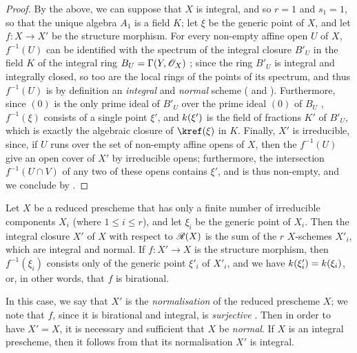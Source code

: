 \begin{proof}
By the above, we can suppose that $X$ is integral, and so $r=1$ and $s_1=1$, so that the unique algebra $A_1$ is a field $K$;
let $\xi$ be the generic point of $X$, and let $f:X\to X'$ be the structure morphism.
For every non-empty affine open $U$ of $X$, $f^{-1}(U)$ can be identified with the spectrum of the integral closure $B'_U$ in the field $K$ of the integral ring $B_U=\Gamma(Y,\mathscr{O}_X)$ ;
since the ring $B'_U$ is integral and integrally closed, so too are the local rings of the points of its spectrum, and thus $f^{-1}(U)$ is by definition an \emph{integral} and \emph{normal} scheme ( and ).
Furthermore, since $(0)$ is the only prime ideal of $B'_U$ over the prime ideal $(0)$ of $B_U$ \cite[t.~1, p.~259]{I-13}, $f^{-1}(\xi)$ consists of a single point $\xi'$, and $k(\xi')$ is the field of fractions $K'$ of $B'_U$, which is exactly the algebraic closure of $\kref(\xi)$ in $K$.
Finally, $X'$ is irreducible, since, if $U$ runs over the set of non-empty affine opens of $X$, then the $f^{-1}(U)$ give an open cover of $X'$ by irreducible opens;
furthermore, the intersection $f^{-1}(U\cap V)$ of any two of these opens contains $\xi'$, and is thus non-empty, and we conclude by .
\end{proof}

\begin{corollary}
Let $X$ be a reduced prescheme that has only a finite number of irreducible components $X_i$ (where $1\leq i\leq r$), and let $\xi_i$ be the generic point of $X_i$.
Then the integral closure $X'$ of $X$ with respect to $\mathscr{R}(X)$ is the sum of the $r$ $X$-schemes $X'_i$, which are integral and normal.
If $f:X'\to X$ is the structure morphism, then $f^{-1}(\xi_i)$ consists only of the generic point $\xi'_i$ of $X'_i$, and we have $k(\xi'_i)=k(\xi_i)$, or, in other words, that $f$ is birational.
\end{corollary}

In this case, we say that $X'$ is the \emph{normalisation} of the reduced prescheme $X$;
we note that $f$, since it is birational and integral, is \emph{surjective} .
Then in order to have $X'=X$, it is necessary and sufficient that $X$ be \emph{normal}.
If $X$ is an integral prescheme, then it follows from  that its normalisation $X'$ is integral.

